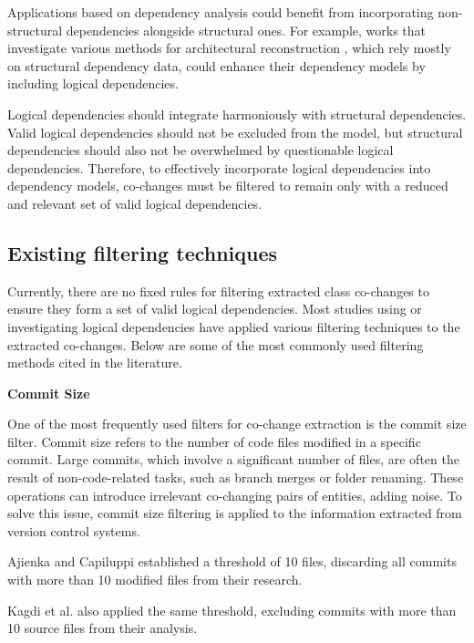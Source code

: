 Applications based on dependency analysis could benefit from incorporating non-structural dependencies alongside structural ones. For example, works that investigate various methods for architectural reconstruction \cite{SoraConti, SoraSem13, PagerankENASE}, which rely mostly on structural dependency data, could enhance their dependency models by including logical dependencies.

Logical dependencies should integrate harmoniously with structural dependencies. Valid logical dependencies should not be excluded from the model, but structural dependencies should also not be overwhelmed by questionable logical dependencies. Therefore, to effectively incorporate logical dependencies into dependency models, co-changes must be filtered to remain only with a reduced and relevant set of valid logical dependencies.




\subsection{Existing filtering techniques}

\hspace{4em}Currently, there are no fixed rules for filtering extracted class co-changes to ensure they form a set of valid logical dependencies. Most studies using or investigating logical dependencies have applied various filtering techniques to the extracted co-changes. Below are some of the most commonly used filtering methods cited in the literature.


\textbf{Commit Size}  

One of the most frequently used filters for co-change extraction is the commit size filter. Commit size refers to the number of code files modified in a specific commit. Large commits, which involve a significant number of files, are often the result of non-code-related tasks, such as branch merges or folder renaming. These operations can introduce irrelevant co-changing pairs of entities, adding noise. To solve this issue, commit size filtering is applied to the information extracted from version control systems.

Ajienka and Capiluppi \cite{DBLP:journals/jss/AjienkaC17} established a threshold of 10 files, discarding all commits with more than 10 modified files from their research.

Kagdi et al. also applied the same threshold, excluding commits with more than 10 source files from their analysis.

